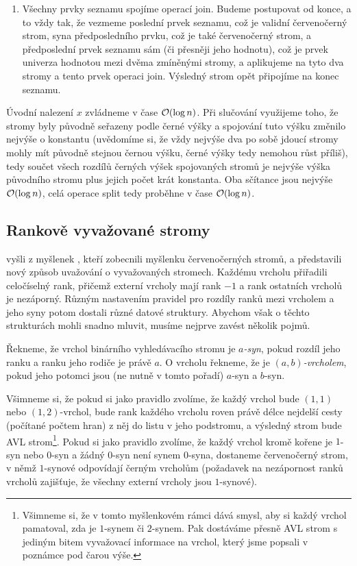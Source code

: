 \begin{enumerate}
\item Všechny prvky seznamu spojíme operací join. Budeme postupovat od konce, a to vždy tak, že vezmeme poslední prvek seznamu, což je validní červenočerný strom, syna předposledního prvku, což je také červenočerný strom, a předposlední prvek seznamu sám (či přesněji jeho hodnotu), což je prvek univerza hodnotou mezi dvěma zmíněnými stromy, a aplikujeme na tyto dva stromy a tento prvek operaci join. Výsledný strom opět připojíme na konec seznamu. 

\end{enumerate}

Úvodní nalezení $x$ zvládneme v čase $\mathcal O(\log n)$. Při slučování využijeme toho, že stromy byly původně seřazeny podle černé výšky a spojování tuto výšku změnilo nejvýše o konstantu (uvědomíme si, že vždy nejvýše dva po sobě jdoucí stromy mohly mít původně stejnou černou výšku, černé výšky tedy nemohou růst příliš), tedy součet všech rozdílů černých výšek spojovaných stromů je nejvýše výška původního stromu plus jejich počet krát konstanta. Oba sčítance jsou nejvýše $\mathcal O(\log n)$, celá operace split tedy proběhne v čase $\mathcal O(\log n)$.

\subsection{Rankově vyvažované stromy}

\citet{rankbalanced} vyšli z myšlenek \citet{dichromatic}, kteří zobecnili
myšlenku červenočerných stromů, a představili nový způsob uvažování o
vyvažovaných stromech. Každému vrcholu přiřadili celočíselný rank, přičemž
externí vrcholy mají rank $-1$ a rank ostatních vrcholů je nezáporný. Různým
nastavením pravidel pro rozdíly ranků mezi vrcholem a jeho syny potom dostali
různé datové struktury. Abychom však o těchto strukturách mohli snadno mluvit,
musíme nejprve zavést několik pojmů.

\begin{definice}
Řekneme, že vrchol binárního vyhledávacího stromu je \emph{$a$-syn}, pokud rozdíl jeho ranku a ranku jeho rodiče je právě $a$. O vrcholu řekneme, že je \emph{$(a,b)$-vrcholem}, pokud jeho potomci jsou (ne nutně v tomto pořadí) $a$-syn a $b$-syn.
\end{definice}

Všimneme si, že pokud si jako pravidlo zvolíme, že každý vrchol bude $(1,1)$
nebo $(1,2)$-vrchol, bude rank každého vrcholu roven právě délce nejdelší cesty
(počítané počtem hran) z něj do listu v jeho podstromu, a výsledný strom bude
AVL strom\footnote{Všimneme si, že v tomto myšlenkovém rámci dává smysl, aby si každý vrchol pamatoval, zda je $1$-synem či $2$-synem. Pak dostáváme přesně AVL strom s jediným bitem vyvažovací informace na vrchol, který jsme popsali v poznámce pod čarou výše.}. Pokud si jako pravidlo zvolíme, že každý vrchol kromě kořene je
$1$-syn nebo $0$-syn a žádný $0$-syn není synem $0$-syna, dostaneme
červenočerný strom, v němž $1$-synové odpovídají černým vrcholům (požadavek na
nezápornost ranků vrcholů zajišťuje, že všechny externí vrcholy jsou
$1$-synové).

